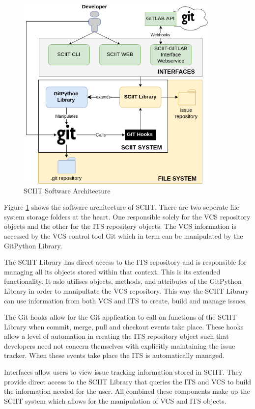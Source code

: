\documentclass{mproj}
\begin{document}
\begin{figure}[h!]
\caption{SCIIT Software Architecture}
\label{fig:sciit-software-arch}
\centering
\includegraphics[width=10cm]{sciit-software-arch}
\end{figure}


Figure \ref{fig:sciit-software-arch} shows the software architecture of SCIIT. There are two seperate file system storage folders at the heart. One responsible solely for the VCS repository objects and the other for the ITS repository objects. The VCS information is accessed by the VCS control tool Git which in term can be manipulated by the GitPython Library. 

The SCIIT Library has direct access to the ITS repository and is responsible for managing all its objects stored within that context. This is its extended functionality. It aslo utilises objects, methods, and attributes of the GitPython Library in order to manipultate the VCS repository. This way the SCIIT Library can use information from both VCS and ITS to create, build and manage issues.

The Git hooks allow for the Git application to call on functions of the SCIIT Library when commit, merge, pull and checkout events take place. These hooks allow a level of automation in creating the ITS repository object such that developers need not concern themselves with explicitly maintaining the issue tracker. When these events take place the ITS is automatically managed.

Interfaces allow users to view issue tracking information stored in SCIIT. They provide direct access to the SCIIT Library that queries the ITS and VCS to build the information needed for the user. All combined these components make up the SCIIT system which allows for the manipulation of VCS and ITS objects.
\end{document}
